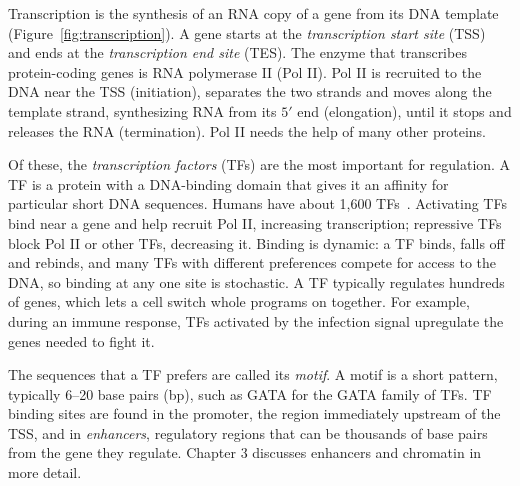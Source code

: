 Transcription is the synthesis of an RNA copy of a gene from its DNA template (Figure~\ref{fig:transcription}). A gene starts at the \emph{transcription start site} (TSS) and ends at the \emph{transcription end site} (TES). The enzyme that transcribes protein-coding genes is RNA polymerase II (Pol II). Pol II is recruited to the DNA near the TSS (initiation), separates the two strands and moves along the template strand, synthesizing RNA from its $5'$ end (elongation), until it stops and releases the RNA (termination). Pol II needs the help of many other proteins.

Of these, the \emph{transcription factors} (TFs) are the most important for regulation. A TF is a protein with a DNA-binding domain that gives it an affinity for particular short DNA sequences. Humans have about 1,600 TFs~\citep{lambert2018}. Activating TFs bind near a gene and help recruit Pol II, increasing transcription; repressive TFs block Pol II or other TFs, decreasing it. Binding is dynamic: a TF binds, falls off and rebinds, and many TFs with different preferences compete for access to the DNA, so binding at any one site is stochastic. A TF typically regulates hundreds of genes, which lets a cell switch whole programs on together. For example, during an immune response, TFs activated by the infection signal upregulate the genes needed to fight it.

The sequences that a TF prefers are called its \emph{motif}. A motif is a short pattern, typically 6--20 base pairs (bp), such as GATA for the GATA family of TFs. TF binding sites are found in the promoter, the region immediately upstream of the TSS, and in \emph{enhancers}, regulatory regions that can be thousands of base pairs from the gene they regulate. Chapter 3 discusses enhancers and chromatin in more detail.


